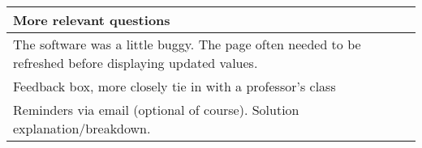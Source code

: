 \begin{longtable}{|p{1\linewidth}|}
		\hline
		More relevant questions                                                                                                                                                                                                                                                                                                                                                                                                                                                                                                                                                                                                                                                                          \\
		\hline
		The software was a little buggy. The page often needed to be refreshed before displaying updated values.                                                                                                                                                                                                                                                                                                                                                                                                                                                                                                                                                                                         \\
		\hline
		Feedback box, more closely tie in with a professor's class                                                                                                                                                                                                                                                                                                                                                                                                                                                                                                                                                                                                                                       \\
		\hline
		Reminders via email (optional of course). Solution explanation/breakdown.                                                                                                                                                                                                                                                                                                                                                                                                                                                                                                                                                                                                                        \\

\end{longtable}
